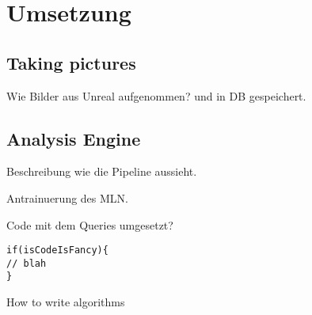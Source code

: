 \graphicspath{{./images/}}      
\def\CHAPTERONE{./chapters/Chapter-1} 

\chapter{Umsetzung}
\label{chap:implementation}
%	


\section{Taking pictures}
\label{sec:takingpics}
Wie Bilder aus Unreal aufgenommen? und in DB gespeichert.

\section{Analysis Engine}
\label{sec:analysisengine}
Beschreibung wie die Pipeline aussieht.


Antrainuerung des MLN.

Code mit dem Queries umgesetzt?


\begin{algorithm}[H]
\begin{lstlisting}
if(isCodeIsFancy){
// blah
}
\end{lstlisting}
 \caption{How to write algorithms}
\end{algorithm}
